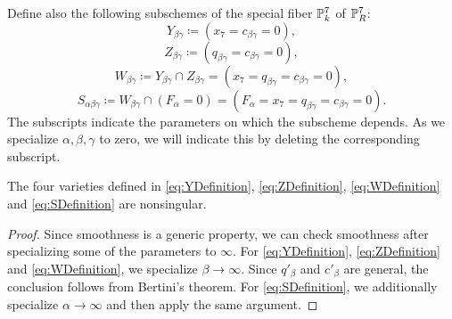Define also the following subschemes of the special fiber $\P^7_k$ of $\P^7_R$:
\begin{equation}
  \label{eq:YDefinition}
  Y_{\beta\gamma} \coloneqq \left(x_7 = c_{\beta\gamma} = 0 \right),
\end{equation}
\begin{equation}
  \label{eq:ZDefinition}
  Z_{\beta\gamma} \coloneqq \left(q_{\beta\gamma} = c_{\beta\gamma} = 0 \right),
\end{equation}
\begin{equation}
  \label{eq:WDefinition}
  W_{\beta\gamma} \coloneqq Y_{\beta\gamma} \cap Z_{\beta\gamma} = \left(x_7 = q_{\beta\gamma} = c_{\beta\gamma} = 0 \right),
\end{equation}
\begin{equation}
  \label{eq:SDefinition}
  S_{\alpha\beta\gamma} \coloneqq W_{\beta\gamma} \cap \left(F_\alpha = 0 \right) = \left(F_\alpha = x_7 = q_{\beta\gamma} = c_{\beta\gamma} = 0 \right).
\end{equation}
The subscripts indicate the parameters on which the subscheme depends. As we specialize $\alpha, \beta, \gamma$ to zero, we will indicate this by deleting the corresponding subscript.

\begin{lemma}
  \label{lem:Smoothness}
  The four varieties defined in \eqref{eq:YDefinition}, \eqref{eq:ZDefinition}, \eqref{eq:WDefinition} and \eqref{eq:SDefinition} are nonsingular.
\end{lemma}
\begin{proof}
  Since smoothness is a generic property, we can check smoothness after specializing some of the parameters to $\infty$. For \eqref{eq:YDefinition}, \eqref{eq:ZDefinition} and \eqref{eq:WDefinition}, we specialize $\beta \to \infty$. Since $q'_{\beta}$ and $c'_{\beta}$ are general, the conclusion follows from Bertini's theorem. For \eqref{eq:SDefinition}, we additionally specialize $\alpha \to \infty$ and then apply the same argument.
\end{proof}

